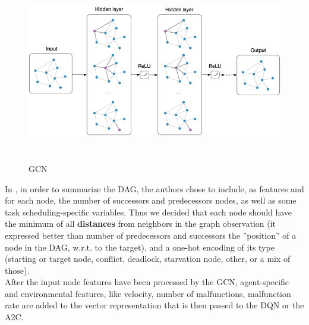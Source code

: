 \begin{figure}[H] 
\includegraphics[height=80mm, width=140mm, scale=0.5]{chapters/gcn.png}
\centering
\caption{GCN}
\label{fig:s5} 
\end{figure}
\noindent
In \cite{a2c}, in order to summarize the DAG, the authors chose to include, as features and for each node, the number of successors and predecessors nodes, as well as some task scheduling-specific variables. Thus we decided that each node should have the minimum of all \textbf{distances} from neighbors in the graph observation (it expressed better than number of predecessors and successors the ''position'' of a node in the DAG, w.r.t. to the target), and a one-hot encoding of its type (starting or target node, conflict, deadlock, starvation node, other, or a mix of those).\\
After the input node features have been processed by the GCN, agent-specific and environmental features, like velocity, number of malfunctions, malfunction rate are added to the vector representation that is then passed to the DQN or the A2C.
